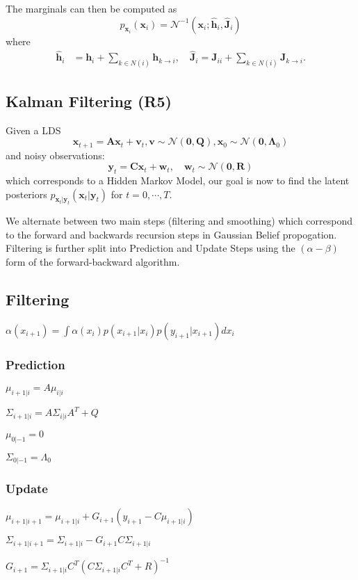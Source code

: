 \documentclass[9pt]{article}
\begin{document}
\begin{multicols}{2}
The marginals can then be computed as 
\[
p_{\mathbf{x}_i}(\mathbf{x}_i) = \mathcal{N}^{-1}(\mathbf{x}_i; \hat{\mathbf{h}}_i, \hat{\mathbf{J}}_i)
\]
where
\begin{align*}
\hat{\mathbf{h}}_i &= \mathbf{h}_i + \sum_{k \in N(i)} \mathbf{h}_{k \to i}, \quad 
\hat{\mathbf{J}}_i = \mathbf{J}_{ii} + \sum_{k \in N(i)} \mathbf{J}_{k \to i}.
\end{align*}

\subsection{Kalman Filtering (R5)}
Given a LDS
\[ \mathbf{x}_{t+1} = \mathbf{A} \mathbf{x}_t + \mathbf{v}_t, \mathbf{v} \sim \mathcal{N}(\mathbf{0}, \mathbf{Q}), \mathbf{x}_0 \sim \mathcal{N}(\mathbf{0}, \mathbf{\Lambda}_0)
\]
and noisy observations: 
\[ \mathbf{y}_t = \mathbf{C}\mathbf{x}_t + \mathbf{w}_t, \quad
\mathbf{w}_t \sim \mathcal{N}(\mathbf{0}, \mathbf{R}) \]
which corresponds to a Hidden Markov Model, our goal is now to find
the latent posteriors $p_{\mathbf{x}_t|\mathbf{y}_t}(\mathbf{x}_t|\mathbf{y}_t)$ for $t=0,\cdots,T$.

We alternate between two main steps (filtering and smoothing) which correspond to the forward and backwards recursion steps in Gaussian
Belief propogation. Filtering is further split into Prediction and
Update Steps using the $(\alpha-\beta)$ form of the forward-backward
algorithm.
\subsection{Filtering}
$\alpha(x_{i+1}) = \int \alpha(x_i) p(x_{i+1} | x_i)p(y_{i+1}|x_{i+1})dx_i$ 
\subsubsection{Prediction}
$\mu_{i+1 | i} = A \mu_{i|i}$

$\Sigma_{i+1|i} = A\Sigma_{i|i}A^T + Q$

$\mu_{0|-1} = 0$

$\Sigma_{0|-1} = \Lambda_0$
\subsubsection{Update}
$\mu_{i+1|i+1} = \mu_{i+1|i} + G_{i+1}(y_{i+1} - C\mu_{i+1|i})$

$\Sigma_{i+1|i+1} = \Sigma_{i+1|i} - G_{i+1}C\Sigma_{i+1|i}$

$G_{i+1} = \Sigma_{i+1|i}C^T(C\Sigma_{i+1|i}C^T + R)^{-1}$

\end{multicols}
\end{document}
